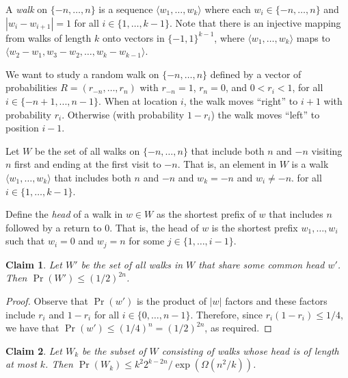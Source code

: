 \documentclass{article}
\newtheorem{clm}{Claim}
\begin{document}
A \emph{walk} on $\{-n,\ldots,n\}$ is a sequence $\langle
w_1,\ldots,w_k\rangle$ where each $w_i\in\{-n,\ldots,n\}$ and
$|w_i-w_{i+1}| = 1$ for all $i\in\{1,\ldots,k-1\}$.  Note that
there is an injective mapping from walks of length $k$ onto vectors
in $\{-1,1\}^{k-1}$, where $\langle w_1,\ldots,w_k\rangle$ maps
to $\langle w_2-w_1,w_3-w_2,\ldots,w_k-w_{k-1}\rangle$.

We want to study a random walk on $\{-n,\ldots,n\}$ defined by a vector
of probabilities $R=(r_{-n},\ldots,r_n)$ with $r_{-n} = 1$, $r_n = 0$,
and $0< r_i < 1$, for all $i \in \{-n+1,...,n-1\}$. When at location $i$,
the walk moves ``right'' to $i+1$ with probability $r_i$.  Otherwise (with
probability $1-r_i$) the walk moves ``left'' to position $i-1$.

Let $W$ be the set of all walks on $\{-n,\ldots,n\}$ that include both $n$
and $-n$ visiting $n$ first and ending at the first visit to $-n$.
That is, an element in $W$ is a walk $\langle w_1,\ldots,w_k\rangle$
that includes both $n$ and $-n$ and $w_k = -n$ and $w_i\neq -n$.
for all $i\in\{1,\ldots,k-1\}$.

Define the \emph{head} of a walk in $w\in W$ as the shortest prefix of $w$ that
includes $n$ followed by a return to 0. That is, the head of $w$ is the
shortest prefix $w_1,\ldots,w_i$ such that $w_i=0$ and $w_j = n$ for some
$j\in\{1,\ldots,i-1\}$.

\begin{clm}\label{claim:one}
Let $W'$ be the set of all walks in $W$ that share some common head $w'$.
Then $\Pr(W') \le (1/2)^{2n}$.
\end{clm}

\begin{proof}
Observe that $\Pr(w')$ is the product of $|w|$ factors and these factors
include $r_i$ and $1-r_i$ for all $i\in\{0,\ldots,n-1\}$.  Therefore,
since $r_i(1-r_i) \le 1/4$, we have that $\Pr(w') \le (1/4)^n =
(1/2)^{2n}$, as required.
\end{proof}


\begin{clm}
Let $W_k$ be the subset of $W$ consisting of walks whose head is of
length at most $k$.  Then $\Pr(W_k) \le k^2 2^{k-2n} / \exp(\Omega(n^2/k))$.
\end{clm}
\end{document}
